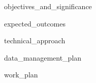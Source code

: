 {objectives_and_significance}

{expected_outcomes}

{technical_approach}

{data_management_plan}

{work_plan}
